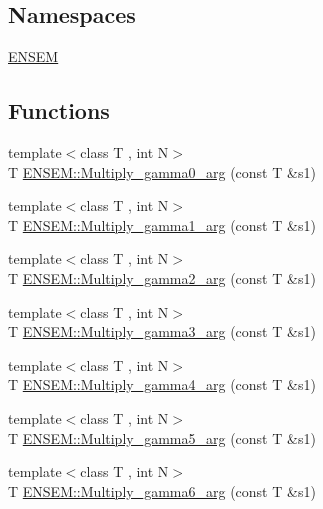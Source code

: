 \subsection*{Namespaces}
\begin{DoxyCompactItemize}
\item 
 \mbox{\hyperlink{namespaceENSEM}{E\+N\+S\+EM}}
\end{DoxyCompactItemize}
\subsection*{Functions}
\begin{DoxyCompactItemize}
\item 
{\footnotesize template$<$class T , int N$>$ }\\T \mbox{\hyperlink{namespaceENSEM_a7da1d54d1c7f3aeeff82db6994436bb4}{E\+N\+S\+E\+M\+::\+Multiply\+\_\+gamma0\+\_\+arg}} (const T \&s1)
\item 
{\footnotesize template$<$class T , int N$>$ }\\T \mbox{\hyperlink{namespaceENSEM_a98f0db7dcdeff4267b1a6f0c13360ba0}{E\+N\+S\+E\+M\+::\+Multiply\+\_\+gamma1\+\_\+arg}} (const T \&s1)
\item 
{\footnotesize template$<$class T , int N$>$ }\\T \mbox{\hyperlink{namespaceENSEM_a0bf52041fa6010680a898ffed180b575}{E\+N\+S\+E\+M\+::\+Multiply\+\_\+gamma2\+\_\+arg}} (const T \&s1)
\item 
{\footnotesize template$<$class T , int N$>$ }\\T \mbox{\hyperlink{namespaceENSEM_a7c6afb65951edae0d204cbe21535a2a5}{E\+N\+S\+E\+M\+::\+Multiply\+\_\+gamma3\+\_\+arg}} (const T \&s1)
\item 
{\footnotesize template$<$class T , int N$>$ }\\T \mbox{\hyperlink{namespaceENSEM_a2916fde58e73dd7198d447fe45384334}{E\+N\+S\+E\+M\+::\+Multiply\+\_\+gamma4\+\_\+arg}} (const T \&s1)
\item 
{\footnotesize template$<$class T , int N$>$ }\\T \mbox{\hyperlink{namespaceENSEM_aa00dbaa87256bd8e2480f91ceb976cb6}{E\+N\+S\+E\+M\+::\+Multiply\+\_\+gamma5\+\_\+arg}} (const T \&s1)
\item 
{\footnotesize template$<$class T , int N$>$ }\\T \mbox{\hyperlink{namespaceENSEM_adbf26a395689fc53e7ec3c67b7512160}{E\+N\+S\+E\+M\+::\+Multiply\+\_\+gamma6\+\_\+arg}} (const T \&s1)
\item 

\end{DoxyCompactItemize}
